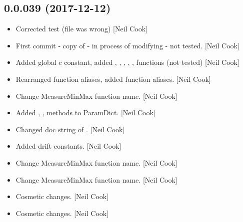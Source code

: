 \documentclass[a4paper,10pt,english]{report}
\begin{document}
\subsection{0.0.039 (2017-12-12)}
\label{\detokenize{misc/changelog:id512}}\begin{itemize}
\item {} 
Corrected  test (file was wrong) {[}Neil Cook{]}

\item {} 
First commit - copy of  - in process of modifying - not
tested. {[}Neil Cook{]}

\item {} 
Added global c constant, added , ,
, , , 
functions (not tested) {[}Neil Cook{]}

\item {} 
Rearranged function aliases, added  function aliases. {[}Neil
Cook{]}

\item {} 
Change MeasureMinMax function name. {[}Neil Cook{]}

\item {} 
Added , ,  methods to ParamDict.
{[}Neil Cook{]}

\item {} 
Changed doc string of . {[}Neil Cook{]}

\item {} 
Added drift constants. {[}Neil Cook{]}

\item {} 
Change MeasureMinMax function name. {[}Neil Cook{]}

\item {} 
Change MeasureMinMax function name. {[}Neil Cook{]}

\item {} 
Cosmetic changes. {[}Neil Cook{]}

\item {} 
Cosmetic changes. {[}Neil Cook{]}

\end{itemize}
\end{document}
